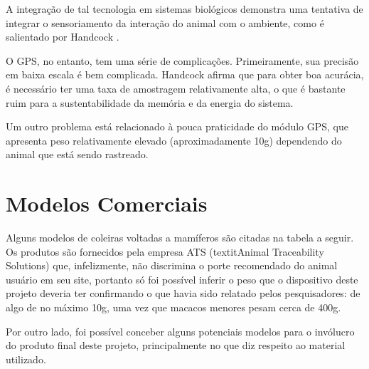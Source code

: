 A integração de tal tecnologia em sistemas biológicos demonstra uma tentativa de integrar o sensoriamento da interação do animal com o ambiente, como é salientado por Handcock \cite{handcock}.

O GPS, no entanto, tem uma série de complicações. Primeiramente, sua precisão em baixa escala é bem complicada. Handcock afirma que para obter boa acurácia, é necessário ter uma taxa de amostragem relativamente alta, o que é bastante ruim para a sustentabilidade da memória e da energia do sistema.

Um outro problema está relacionado à pouca praticidade do módulo GPS, que apresenta peso relativamente elevado (aproximadamente 10g) dependendo do animal que está sendo rastreado.

\section{Modelos Comerciais}
Alguns modelos de coleiras voltadas a mamíferos são citadas na tabela a seguir. Os produtos são fornecidos pela empresa ATS (textit{Animal Traceability Solutions}) \cite{ats} que, infelizmente, não discrimina o porte recomendado do animal usuário em seu site, portanto só foi possível inferir o peso que o dispositivo deste projeto deveria ter confirmando o que havia sido relatado pelos pesquisadores: de algo de no máximo 10g, uma vez que macacos menores pesam cerca de 400g.

Por outro lado, foi possível conceber alguns potenciais modelos para o invólucro do produto final deste projeto, principalmente no que diz respeito ao material utilizado.

